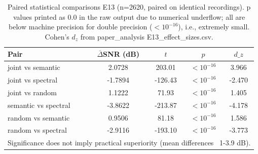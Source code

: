 \begin{table}[t]
\centering
\caption{Paired statistical comparisons E13 (n=2620, paired on identical recordings). p values printed as 0.0 in the raw output due to numerical underflow; all are below machine precision for double precision ($<10^{-16}$), i.e., extremely small. Cohen's $d_z$ from paper_analysis E13_effect_sizes.csv.}
\label{tab:paired-e13}
\scriptsize
\begin{tabular}{lcccc}
\toprule
\textbf{Pair} & \textbf{$\bar{\Delta}$SNR (dB)} & \textbf{$t$} & \textbf{$p$} & \textbf{$d\_z$} \\
\midrule
joint vs semantic & 2.0728 & 203.01 & $<10^{-16}$ & 3.966 \\
joint vs spectral & -1.7894 & -126.43 & $<10^{-16}$ & -2.470 \\
joint vs random & 1.1222 & 71.93 & $<10^{-16}$ & 1.405 \\
semantic vs spectral & -3.8622 & -213.87 & $<10^{-16}$ & -4.178 \\
random vs semantic & 0.9506 & 81.18 & $<10^{-16}$ & 1.586 \\
random vs spectral & -2.9116 & -193.10 & $<10^{-16}$ & -3.773 \\
\bottomrule
\multicolumn{5}{l}{\footnotesize Significance does not imply practical superiority (mean differences ~1-3.9 dB).}\\
\end{tabular}
\end{table}
